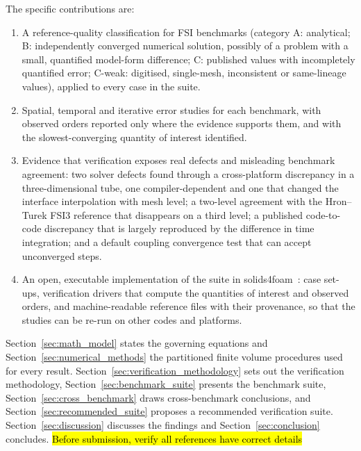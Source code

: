 The specific contributions are:
\begin{enumerate}
    \item A reference-quality classification for FSI benchmarks (category A: analytical; B: independently converged numerical solution, possibly of a problem with a small, quantified model-form difference; C: published values with incompletely quantified error; C-weak: digitised, single-mesh, inconsistent or same-lineage values), applied to every case in the suite.
    \item Spatial, temporal and iterative error studies for each benchmark, with observed orders reported only where the evidence supports them, and with the slowest-converging quantity of interest identified.
    \item Evidence that verification exposes real defects and misleading benchmark agreement: two solver defects found through a cross-platform discrepancy in a three-dimensional tube, one compiler-dependent and one that changed the interface interpolation with mesh level; a two-level agreement with the Hron--Turek FSI3 reference that disappears on a third level; a published code-to-code discrepancy that is largely reproduced by the difference in time integration; and a default coupling convergence test that can accept unconverged steps.
    \item An open, executable implementation of the suite in solids4foam~\citep{Cardiff2025}: case set-ups, verification drivers that compute the quantities of interest and observed orders, and machine-readable reference files with their provenance, so that the studies can be re-run on other codes and platforms.
\end{enumerate}

Section~\ref{sec:math_model} states the governing equations and Section~\ref{sec:numerical_methods} the partitioned finite volume procedures used for every result.
Section~\ref{sec:verification_methodology} sets out the verification methodology, Section~\ref{sec:benchmark_suite} presents the benchmark suite, Section~\ref{sec:cross_benchmark} draws cross-benchmark conclusions, and Section~\ref{sec:recommended_suite} proposes a recommended verification suite.
Section~\ref{sec:discussion} discusses the findings and Section~\ref{sec:conclusion} concludes.
\hl{Before submission, verify all references have correct details}
